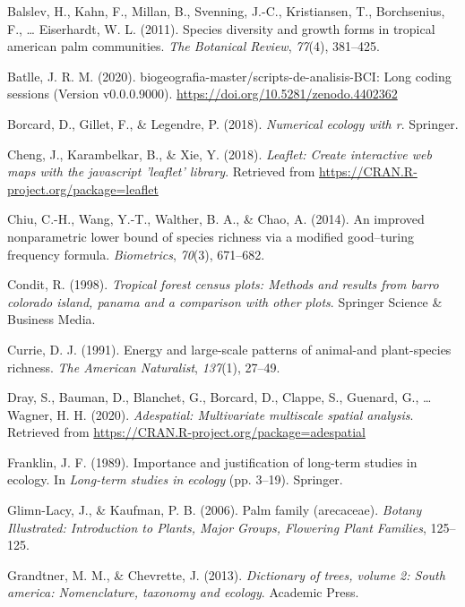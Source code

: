 \documentclass[11pt,]{article}
\begin{document}
\hypertarget{ref-balslev2011species}{}
Balslev, H., Kahn, F., Millan, B., Svenning, J.-C., Kristiansen, T.,
Borchsenius, F., \ldots{} Eiserhardt, W. L. (2011). Species diversity
and growth forms in tropical american palm communities. \emph{The
Botanical Review}, \emph{77}(4), 381--425.

\hypertarget{ref-jose_ramon_martinez_batlle_2020_4402362}{}
Batlle, J. R. M. (2020). biogeografia-master/scripts-de-analisis-BCI:
Long coding sessions (Version v0.0.0.9000).
\url{https://doi.org/10.5281/zenodo.4402362}

\hypertarget{ref-borcard2018numerical}{}
Borcard, D., Gillet, F., \& Legendre, P. (2018). \emph{Numerical ecology
with r}. Springer.

\hypertarget{ref-Leaflet}{}
Cheng, J., Karambelkar, B., \& Xie, Y. (2018). \emph{Leaflet: Create
interactive web maps with the javascript 'leaflet' library}. Retrieved
from \url{https://CRAN.R-project.org/package=leaflet}

\hypertarget{ref-chiu2014improved}{}
Chiu, C.-H., Wang, Y.-T., Walther, B. A., \& Chao, A. (2014). An
improved nonparametric lower bound of species richness via a modified
good--turing frequency formula. \emph{Biometrics}, \emph{70}(3),
671--682.

\hypertarget{ref-condit1998tropical}{}
Condit, R. (1998). \emph{Tropical forest census plots: Methods and
results from barro colorado island, panama and a comparison with other
plots}. Springer Science \& Business Media.

\hypertarget{ref-currie1991energy}{}
Currie, D. J. (1991). Energy and large-scale patterns of animal-and
plant-species richness. \emph{The American Naturalist}, \emph{137}(1),
27--49.

\hypertarget{ref-adespatial}{}
Dray, S., Bauman, D., Blanchet, G., Borcard, D., Clappe, S., Guenard,
G., \ldots{} Wagner, H. H. (2020). \emph{Adespatial: Multivariate
multiscale spatial analysis}. Retrieved from
\url{https://CRAN.R-project.org/package=adespatial}

\hypertarget{ref-franklin1989importance}{}
Franklin, J. F. (1989). Importance and justification of long-term
studies in ecology. In \emph{Long-term studies in ecology} (pp. 3--19).
Springer.

\hypertarget{ref-glimn2006palm}{}
Glimn-Lacy, J., \& Kaufman, P. B. (2006). Palm family (arecaceae).
\emph{Botany Illustrated: Introduction to Plants, Major Groups,
Flowering Plant Families}, 125--125.

\hypertarget{ref-grandtner2013dictionary}{}
Grandtner, M. M., \& Chevrette, J. (2013). \emph{Dictionary of trees,
volume 2: South america: Nomenclature, taxonomy and ecology}. Academic
Press.
\end{document}
